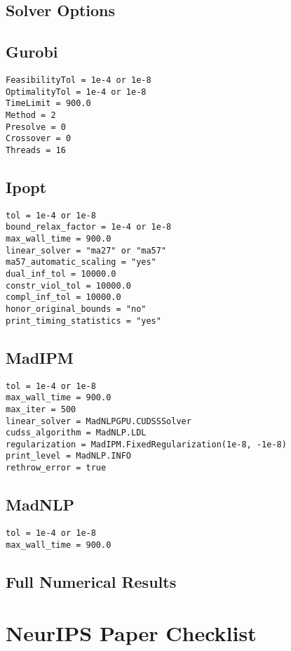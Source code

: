 \documentclass{article}
\begin{document}
\subsection{Solver Options}
\subsection{Gurobi}
\begin{verbatim}
FeasibilityTol = 1e-4 or 1e-8
OptimalityTol = 1e-4 or 1e-8
TimeLimit = 900.0
Method = 2 
Presolve = 0
Crossover = 0
Threads = 16
\end{verbatim}
\subsection{Ipopt}
\begin{verbatim}
tol = 1e-4 or 1e-8
bound_relax_factor = 1e-4 or 1e-8
max_wall_time = 900.0
linear_solver = "ma27" or "ma57"
ma57_automatic_scaling = "yes"
dual_inf_tol = 10000.0
constr_viol_tol = 10000.0
compl_inf_tol = 10000.0
honor_original_bounds = "no"
print_timing_statistics = "yes"
\end{verbatim}
\subsection{MadIPM} 
\begin{verbatim}
tol = 1e-4 or 1e-8
max_wall_time = 900.0
max_iter = 500
linear_solver = MadNLPGPU.CUDSSSolver
cudss_algorithm = MadNLP.LDL
regularization = MadIPM.FixedRegularization(1e-8, -1e-8)
print_level = MadNLP.INFO
rethrow_error = true
\end{verbatim}
\subsection{MadNLP}
\begin{verbatim}
tol = 1e-4 or 1e-8
max_wall_time = 900.0
\end{verbatim}
\subsection{Full Numerical Results}





 
\newpage
\section*{NeurIPS Paper Checklist}
\end{document}
